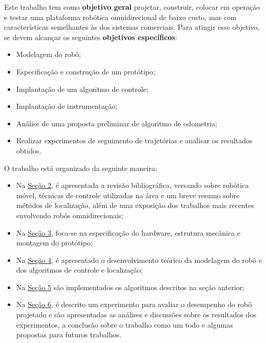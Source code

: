
Este trabalho tem como \textbf{objetivo geral} projetar, construir, colocar em operação e testar uma plataforma robótica omnidirecional de baixo custo, mas com características semelhantes às dos sistemas comerciais. Para atingir esse objetivo, se devem alcançar os seguintes \textbf{objetivos específicos}:

\begin{itemize}
  \item{Modelagem do robô;} %
  \item{Especificação e construção de um protótipo;}
  \item{Implantação de um algoritmo de controle;} %
  \item{Implantação de instrumentação;}
  \item{Análise de uma proposta preliminar de algoritmo de odometria;}
  \item{Realizar experimentos de seguimento de trajetórias e analisar os resultados obtidos.}
\end{itemize}


O trabalho está organizado da seguinte maneira:
\begin{itemize}
  \item{Na \hyperref[sec:revbib]{Seção 2}, é apresentada a revisão bibliográfica, versando sobre robótica móvel, técnicas de controle utilizadas na área e um breve resumo sobre métodos de localização, além de uma exposição dos trabalhos mais recentes envolvendo robôs omnidirecionais;} %
  \item{Na \hyperref[sec:montagem]{Seção 3}, foca-se na especificação do hardware, estrutura mecânica e montagem do protótipo;}
  \item{Na \hyperref[sec:teorico]{Seção 4}, é apresentado o desenvolvimento teórico da modelagem do robô e dos algoritmos de controle e localização;}
  \item{Na \hyperref[sec:software]{Seção 5} são implementados os algoritmos descritos na seção anterior;}
  \item{Na \hyperref[sec:experimental]{Seção 6}, é descrito um experimento para avaliar o desempenho do robô projetado e são apresentadas as análises e discussões sobre os resultados dos experimentos, a conclusão sobre o trabalho como um todo e algumas propostas para futuros trabalhos.}
\end{itemize}

